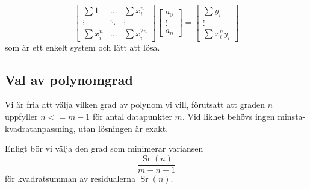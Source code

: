 \begin{equation}
\begin{bmatrix}
\sum 1 & \dots & \sum x_i^n \\
\vdots & \ddots & \vdots \\
\sum x_i^n & \dots & \sum x_i^{2n}
\end{bmatrix}
\begin{bmatrix}
a_0 \\
\vdots \\
a_n
\end{bmatrix} = \begin{bmatrix}
\sum y_i \\
\vdots \\
\sum x_i^n y_i
\end{bmatrix}
\label{eqn:ls}
\end{equation}
som är ett enkelt system och lätt att lösa.

\subsection{Val av polynomgrad}

Vi är fria att välja vilken grad av polynom vi vill, förutsatt att graden $n$ uppfyller $n <= m-1$ för antal datapunkter $m$. Vid likhet behövs ingen minsta-kvadratanpassning, utan lösningen är exakt.

Enligt \cite{ref:kaw} bör vi välja den grad som minimerar variansen
\begin{equation}
\frac{\operatorname{Sr}(n)}{m-n-1}
\label{eqn:kaw}
\end{equation}
för kvadratsumman av residualerna $\operatorname{Sr}(n)$.

